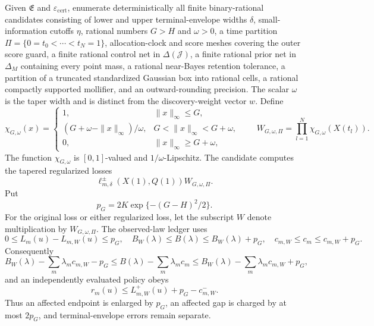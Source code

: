 Given \(\mathfrak E\) and \(\varepsilon_{\mathrm{cert}}\), enumerate deterministically all finite binary-rational candidates consisting of lower and upper terminal-envelope widths \(\delta\), small-information cutoffs \(\eta\), rational numbers \(G>H\) and \(\omega>0\), a time partition \(\Pi=\{0=t_0<\cdots<t_N=1\}\), allocation-clock and score meshes covering the outer score guard, a finite rational control net in \(\Delta(\mathcal J)\), a finite rational prior net in \(\Delta_M\) containing every point mass, a rational near-Bayes retention tolerance, a partition of a truncated standardized Gaussian box into rational cells, a rational compactly supported mollifier, and an outward-rounding precision.  The scalar \(\omega\) is the taper width and is distinct from the discovery-weight vector \(w\).  Define
\[
 \chi_{G,\omega}(x)=
 \begin{cases}
 1,&\|x\|_\infty\leq G,\\
 (G+\omega-\|x\|_\infty)/\omega,&G<\|x\|_\infty<G+\omega,\\
 0,&\|x\|_\infty\geq G+\omega,
 \end{cases}
 \qquad
 W_{G,\omega,\Pi}=\prod_{l=1}^N\chi_{G,\omega}(X(t_l)).
\]
The function \(\chi_{G,\omega}\) is \([0,1]\)-valued and \(1/\omega\)-Lipschitz.  The candidate computes the tapered regularized losses
\[
 \ell_{m,\delta}^{\pm}(X(1),Q(1))W_{G,\omega,\Pi}.
\]
Put
\[
 p_G=2K\exp\{-(G-H)^2/2\}.
\]
For the original loss or either regularized loss, let the subscript \(W\) denote multiplication by \(W_{G,\omega,\Pi}\).  The observed-law ledger uses
\[
 0\leq L_m(u)-L_{m,W}(u)\leq p_G,
 \quad B_W(\lambda)\leq B(\lambda)\leq B_W(\lambda)+p_G,
 \quad c_{m,W}\leq c_m\leq c_{m,W}+p_G.
\]
Consequently
\[
 B_W(\lambda)-\sum_m\lambda_mc_{m,W}-p_G
 \leq B(\lambda)-\sum_m\lambda_mc_m
 \leq B_W(\lambda)-\sum_m\lambda_mc_{m,W}+p_G,
\]
and an independently evaluated policy obeys
\[
 r_m(u)\leq L_{m,W}^{+}(u)+p_G-c_{m,W}^{-}.
\]
Thus an affected endpoint is enlarged by \(p_G\), an affected gap is charged by at most \(2p_G\), and terminal-envelope errors remain separate.

